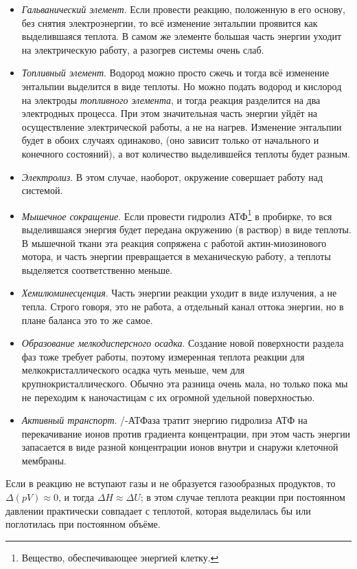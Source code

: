 \begin{itemize}
    \item \textit{Гальванический элемент}. Если провести реакцию, положенную в его основу, без снятия электроэнергии, то всё изменение энтальпии проявится как выделившаяся теплота. В самом же элементе большая часть энергии уходит на электрическую работу, а разогрев системы очень слаб.
    \item \textit{Топливный элемент}. Водород можно просто сжечь и тогда всё изменение энтальпии выделится в виде теплоты. Но можно подать водород и кислород на электроды \emph{топливного элемента}, и тогда реакция  разделится на два электродных процесса. При этом значительная часть энергии уйдёт на осуществление электрической работы, а не на нагрев. Изменение энтальпии будет в обоих случаях одинаково, (оно зависит только от начального и конечного состояний), а вот количество выделившейся теплоты будет разным.
    \item \textit{Электролиз}. В этом случае, наоборот, окружение совершает работу над системой.
    \item \textit{Мышечное сокращение}. Если провести гидролиз АТФ\footnote{Вещество, обеспечивающее энергией клетку.} в пробирке, то вся выделившаяся энергия будет передана окружению (в раствор) в виде теплоты. В мышечной ткани эта реакция сопряжена с работой актин-миозинового мотора, и часть энергии превращается в механическую работу, а теплоты выделяется соответственно меньше.
    \item \textit{Хемилюминесценция}. Часть энергии реакции уходит в виде излучения, а не тепла. Строго говоря, это не работа, а отдельный канал оттока энергии, но в плане баланса это то же самое.
    \item \textit{Образование мелкодисперсного осадка}. Создание новой поверхности раздела фаз тоже требует работы, поэтому измеренная теплота реакции для мелкокристаллического осадка чуть меньше, чем для крупнокристаллического. Обычно эта разница очень мала, но только пока мы не переходим к наночастицам с их огромной удельной поверхностью.
    \item \textit{Активный транспорт}. /-АТФаза тратит энергию гидролиза АТФ на перекачивание ионов против градиента концентрации, при этом часть энергии запасается в виде разной концентрации ионов внутри и снаружи клеточной мембраны.
\end{itemize}

Если в реакцию не вступают газы и не образуется газообразных продуктов, то $\Delta{}(pV) \approx 0$, и тогда $\Delta{}H \approx \Delta{}U$; в этом случае теплота реакции при постоянном давлении практически совпадает с теплотой, которая выделилась бы или поглотилась при постоянном объёме.

